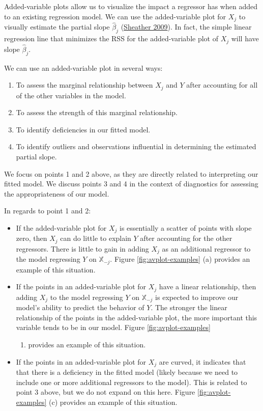 \documentclass[
]{book}
\providecommand{\tightlist}{%
  \setlength{\itemsep}{0pt}\setlength{\parskip}{0pt}}
\theoremstyle{definition}
\theoremstyle{definition}
\theoremstyle{definition}
\theoremstyle{definition}
\theoremstyle{remark}
\begin{document}
Added-variable plots allow us to visualize the impact a regressor has
when added to an existing regression model. We can use the
added-variable plot for \(X_j\) to visually estimate the partial slope
\(\hat{\beta}_{j}\) (\protect\hyperlink{ref-sheather2009modern}{Sheather 2009}). In fact, the simple linear
regression line that minimizes the RSS for the added-variable plot of
\(X_j\) will have slope \(\hat{\beta}_j\).

We can use an added-variable plot in several ways:

\begin{enumerate}
\def\labelenumi{\arabic{enumi}.}
\tightlist
\item
  To assess the marginal relationship between \(X_j\) and \(Y\) after
  accounting for all of the other variables in the model.
\item
  To assess the strength of this marginal relationship.
\item
  To identify deficiencies in our fitted model.
\item
  To identify outliers and observations influential in determining the
  estimated partial slope.
\end{enumerate}

We focus on points 1 and 2 above, as they are directly related to
interpreting our fitted model. We discuss points 3 and 4 in the context
of diagnostics for assessing the appropriateness of our model.

In regards to point 1 and 2:

\begin{itemize}
\tightlist
\item
  If the added-variable plot for \(X_j\) is essentially a scatter of
  points with slope zero, then \(X_j\) can do little to explain \(Y\)
  after accounting for the other regressors. There is little to gain
  in adding \(X_j\) as an additional regressor to the model regressing
  \(Y\) on \(\mathbb{X}_{-j}\). Figure \ref{fig:avplot-examples} (a)
  provides an example of this situation.
\item
  If the points in an added-variable plot for \(X_j\) have a linear
  relationship, then adding \(X_j\) to the model regressing \(Y\) on
  \(\mathbb{X}_{-j}\) is expected to improve our model's ability to
  predict the behavior of \(Y\). The stronger the linear relationship of
  the points in the added-variable plot, the more important this
  variable tends to be in our model. Figure \ref{fig:avplot-examples}

  \begin{enumerate}
  \def\labelenumi{(\alph{enumi})}
  \setcounter{enumi}{1}
  \tightlist
  \item
    provides an example of this situation.
  \end{enumerate}
\item
  If the points in an added-variable plot for \(X_j\) are curved, it
  indicates that that there is a deficiency in the fitted model
  (likely because we need to include one or more additional regressors
  to the model). This is related to point 3 above, but we do not
  expand on this here. Figure \ref{fig:avplot-examples} (c) provides
  an example of this situation.
\end{itemize}
\end{document}
